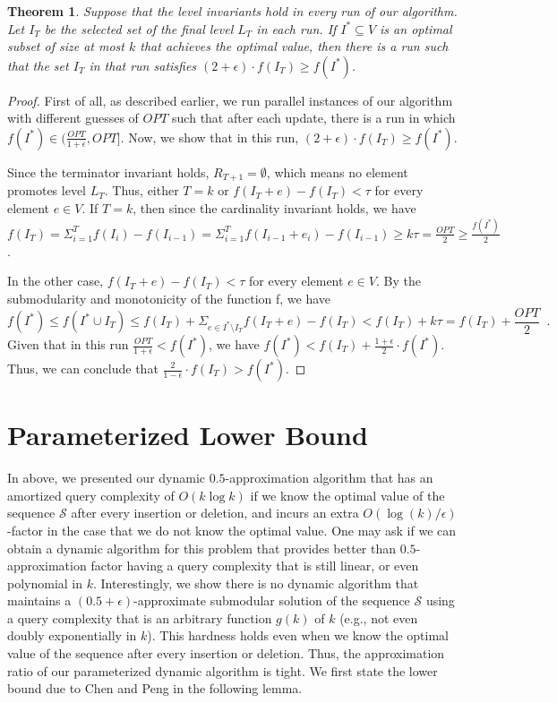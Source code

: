 \documentclass[11pt]{article}
\newtheorem{theorem}{Theorem}
\newcommand{\mO}{O}
\newcommand{\marginalgain}[2]{f(#2 + #1) - f(#2)}
\begin{document}
\begin{theorem}
Suppose that the level invariants hold in every run of our algorithm.
Let $I_T$ be the selected set of the final level $L_T$ in each run. 
If $I^* \subseteq V$ is an optimal subset of size at most $k$ that achieves the optimal value, then there is a run such that the set $I_T$ in that run satisfies $(2 + \epsilon) \cdot f(I_T) \ge f(I^*)$.
\end{theorem}

\begin{proof}
First of all, as described earlier, we run parallel instances of our algorithm with different guesses of $OPT$ such that after each update, there is a run in which $f(I^*) \in (\frac{OPT}{1+\epsilon}, OPT]$.
Now, we show that in this run, $(2 + \epsilon) \cdot f(I_T) \ge f(I^*)$.

Since the terminator invariant holds, $R_{T+1}=\emptyset$, which means no element promotes level $L_T$.
Thus, either $T=k$ or $\marginalgain{e}{I_T}<\tau$ for every element $e \in V$. 
If $T = k$, then since the cardinality invariant holds, we have $f(I_T) = \Sigma_{i = 1}^{T} f(I_i) - f(I_{i-1}) = \Sigma_{i = 1}^{T} \marginalgain{e_i}{I_{i-1}} \geq k\tau = \frac{OPT}{2} \ge \frac{f(I^*)}{2}$. 

In the other case,  $\marginalgain{e}{I_T}<\tau$ for every element $e \in V$. 
By the submodularity and monotonicity of the function f, we have
$$
f(I^*) \leq f(I^* \cup I_{T}) \leq 
f(I_T) + \Sigma_{e \in I^* \setminus I_{T}} \marginalgain{e}{I_T} < f(I_T) + k\tau = f(I_T) + \frac{OPT}{2} \enspace .
$$
Given that in this run $\frac{OPT}{1+\epsilon} < f(I^*)$, we have $f(I^*) < f(I_T) + \frac{1+\epsilon}{2}\cdot f(I^*)$. Thus, we can conclude that $\frac{2}{1-\epsilon} \cdot f(I_T) > f(I^*)$.
\end{proof}

 \section{Parameterized Lower Bound}
\label{sec:ower:bound}
In above, we presented our dynamic $0.5$-approximation algorithm that has an amortized query complexity of $\mO(k\log{k})$ 
if we know the optimal value of the sequence $\mathcal{S}$ after every insertion or deletion, and 
incurs an extra $\mO(\log(k)/\epsilon)$-factor in the case that we do not know the optimal value.
One may ask if we can obtain a dynamic algorithm for this problem that 
provides better than $0.5$-approximation factor having a query complexity that is still linear, or even polynomial in $k$.
Interestingly, we show there is no dynamic algorithm that maintains a $(0.5+\epsilon)$-approximate submodular solution of the sequence $\mathcal{S}$
using a query complexity that is an arbitrary function $g(k)$ of $k$ (e.g., not even doubly exponentially in $k$). 
This hardness holds even when we know the optimal value of the sequence after every insertion or deletion.   
Thus, the approximation ratio of our parameterized dynamic algorithm is tight.
We first state the lower bound due to Chen and Peng \cite[Theorem 1.1]{DBLP:journals/corr/abs-2111-03198} in 
the following lemma. 
\end{document}
